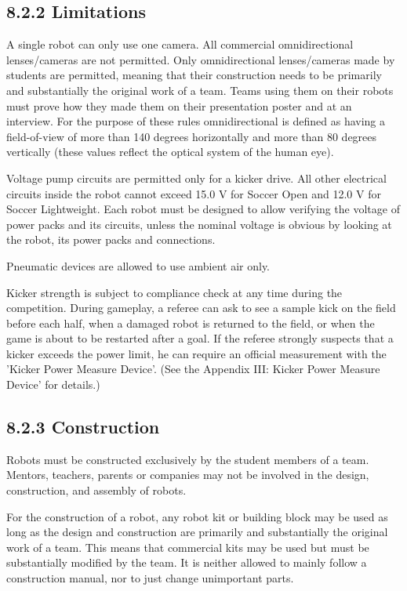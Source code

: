 \documentclass{article}
\begin{document}
\subsection{\textcolor{color-5}{8}.2.2 Limitations\label{ref-056}}

\textcolor{color-5}{A single robot can only use one camera. All commercial omnidirectional lenses/cameras are not permitted. Only omnidirectional lenses/cameras made by students are permitted, meaning that} \textcolor{color-5}{t}\textcolor{color-5}{heir construction needs to be primarily and substantially the original work of a team. Teams using them on their robots must prove how they made them on their presentation poster and at an interview. For the purpose of these rules omnidirectional is defined as having a field-of-view of more than 140 degrees horizontally and more than 80 degrees vertically (these values reflect the optical system of the human eye).}

Voltage pump circuits are permitted only for a kicker drive. All other electrical circuits inside the robot cannot exceed 15.0 V for \textcolor{color-5}{Soccer} Open and 12.0 V for \textcolor{color-5}{Soccer Lightweight}. Each robot must be designed to allow verifying the voltage of power packs and its circuits, unless the nominal voltage is obvious by looking at the robot, its power packs and connections. 

Pneumatic devices are allowed to use ambient air only. 

Kicker strength is subject to compliance check at any time during the competition. During gameplay, a referee can ask to see a sample kick on the field before each half, when a damaged robot is returned to the field, or when the game is about to be restarted after a goal. If the referee strongly suspects that a kicker exceeds the power limit, he can require an official measurement with the 'Kicker Power Measure Device'. (See the Appendix \textcolor{color-5}{III:} Kicker Power Measure Device' for details.) 

\subsection{\textcolor{color-5}{8}.2.3 Construction \label{ref-057}}

Robots must be constructed exclusively by the student members of a team. Mentors, teachers, parents or companies may not be involved in the design, construction, and assembly of robots. 

\textcolor{color-5}{For the construction of a robot, any robot kit or building block may be used as long as the design and construction are primarily and substantially the original work of a team. This means that commercial kits may be used but must be substantially modified by the team. It is neither allowed to mainly follow a construction manual, nor to just change unimportant parts.} 
\end{document}
